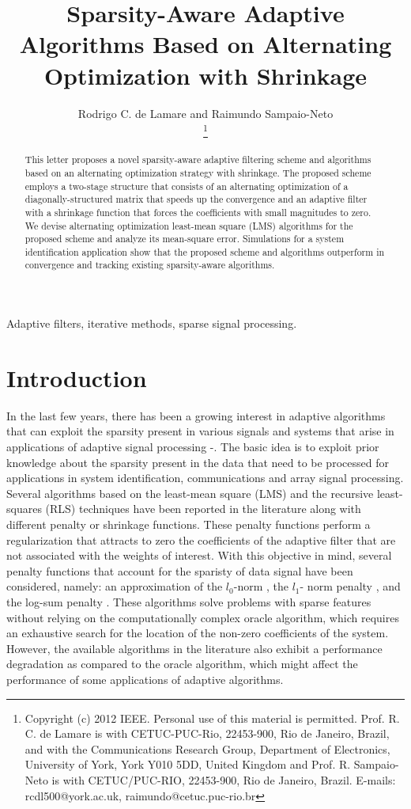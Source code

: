 \documentclass[10pt,onecolumn]{IEEEtran}
\title{Sparsity-Aware Adaptive Algorithms Based on Alternating Optimization with Shrinkage }
\author{Rodrigo C. de Lamare and Raimundo Sampaio-Neto  \vspace{-0.25em} \\
\thanks{Copyright (c) 2012 IEEE. Personal use of this material is permitted.
Prof. R. C. de Lamare is with CETUC-PUC-Rio, 22453-900, Rio de Janeiro,
Brazil, and with the Communications Research Group, Department of
Electronics, University of York, York Y010 5DD, United Kingdom and
Prof. R. Sampaio-Neto is with CETUC/PUC-RIO, 22453-900, Rio de
Janeiro, Brazil. E-mails: rcdl500@york.ac.uk,
raimundo@cetuc.puc-rio.br} }
\begin{document}
\maketitle

\begin{abstract}
This letter proposes a novel sparsity-aware adaptive filtering
scheme and algorithms based on an alternating optimization strategy
with shrinkage. The proposed scheme employs a two-stage structure
that consists of an alternating optimization of a
diagonally-structured matrix that speeds up the convergence and an
adaptive filter with a shrinkage function that forces the
coefficients with small magnitudes to zero. We devise alternating
optimization least-mean square (LMS) algorithms for the proposed
scheme and analyze its mean-square error. Simulations for a system
identification application show that the proposed scheme and
algorithms outperform in convergence and tracking existing
sparsity-aware algorithms.

\end{abstract}
\begin{keywords}
{Adaptive filters, iterative methods, sparse signal processing.}
\end{keywords}


\section{Introduction}

In the last few years, there has been a growing interest in adaptive
algorithms that can exploit the sparsity present in various signals
and systems that arise in applications of adaptive signal processing
\cite{gu}-\cite{jidf}. The basic idea is to exploit prior knowledge
about the sparsity present in the data that need to be processed for
applications in system identification, communications and array
signal processing. Several algorithms based on the least-mean square
(LMS) \cite{gu,chen} and the recursive least-squares (RLS)
\cite{babadi,angelosante,eksioglu,eksioglu2} techniques have been
reported in the literature along with different penalty or shrinkage
functions. These penalty functions perform a regularization that
attracts to zero the coefficients of the adaptive filter that are
not associated with the weights of interest. With this objective in
mind, several penalty functions that account for the sparisty of
data signal have been considered, namely: {an approximation of the
$l_0$-norm \cite{gu,eksioglu2}, the $l_1$- norm penalty
\cite{chen,eksioglu}, and the log-sum penalty
\cite{chen,eksioglu,candes}}. These algorithms solve problems with
sparse features without relying on the computationally complex
oracle algorithm, which requires an exhaustive search for the
location of the non-zero coefficients of the system. However, the
available algorithms in the literature also exhibit a performance
degradation as compared to the oracle algorithm, which might affect
the performance of some applications of adaptive algorithms.
\end{document}
